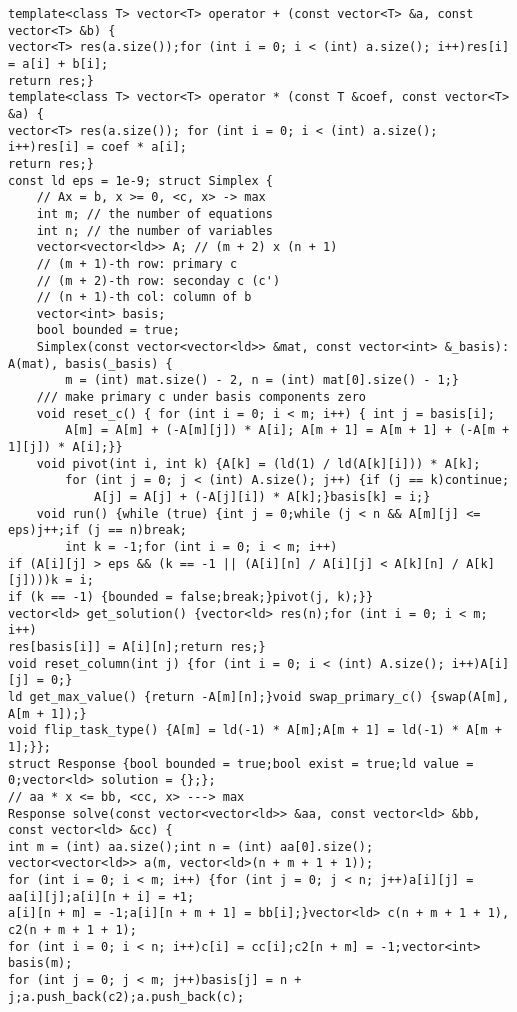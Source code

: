 \documentclass[a4paper,12pt]{article}
\begin{document}
\begin{verbatim}
template<class T> vector<T> operator + (const vector<T> &a, const vector<T> &b) {
vector<T> res(a.size());for (int i = 0; i < (int) a.size(); i++)res[i] = a[i] + b[i];
return res;}
template<class T> vector<T> operator * (const T &coef, const vector<T> &a) {
vector<T> res(a.size()); for (int i = 0; i < (int) a.size(); i++)res[i] = coef * a[i];
return res;}
const ld eps = 1e-9; struct Simplex {
    // Ax = b, x >= 0, <c, x> -> max
    int m; // the number of equations
    int n; // the number of variables
    vector<vector<ld>> A; // (m + 2) x (n + 1)
    // (m + 1)-th row: primary c
    // (m + 2)-th row: seconday c (c')
    // (n + 1)-th col: column of b
    vector<int> basis;
    bool bounded = true;
    Simplex(const vector<vector<ld>> &mat, const vector<int> &_basis): A(mat), basis(_basis) {
        m = (int) mat.size() - 2, n = (int) mat[0].size() - 1;}
    /// make primary c under basis components zero
    void reset_c() { for (int i = 0; i < m; i++) { int j = basis[i];
        A[m] = A[m] + (-A[m][j]) * A[i]; A[m + 1] = A[m + 1] + (-A[m + 1][j]) * A[i];}}
    void pivot(int i, int k) {A[k] = (ld(1) / ld(A[k][i])) * A[k];
        for (int j = 0; j < (int) A.size(); j++) {if (j == k)continue;
            A[j] = A[j] + (-A[j][i]) * A[k];}basis[k] = i;}
    void run() {while (true) {int j = 0;while (j < n && A[m][j] <= eps)j++;if (j == n)break;
        int k = -1;for (int i = 0; i < m; i++)
if (A[i][j] > eps && (k == -1 || (A[i][n] / A[i][j] < A[k][n] / A[k][j])))k = i;
if (k == -1) {bounded = false;break;}pivot(j, k);}}
vector<ld> get_solution() {vector<ld> res(n);for (int i = 0; i < m; i++)
res[basis[i]] = A[i][n];return res;}
void reset_column(int j) {for (int i = 0; i < (int) A.size(); i++)A[i][j] = 0;}
ld get_max_value() {return -A[m][n];}void swap_primary_c() {swap(A[m], A[m + 1]);}
void flip_task_type() {A[m] = ld(-1) * A[m];A[m + 1] = ld(-1) * A[m + 1];}};
struct Response {bool bounded = true;bool exist = true;ld value = 0;vector<ld> solution = {};};
// aa * x <= bb, <cc, x> ---> max
Response solve(const vector<vector<ld>> &aa, const vector<ld> &bb, const vector<ld> &cc) {
int m = (int) aa.size();int n = (int) aa[0].size();
vector<vector<ld>> a(m, vector<ld>(n + m + 1 + 1));
for (int i = 0; i < m; i++) {for (int j = 0; j < n; j++)a[i][j] = aa[i][j];a[i][n + i] = +1;
a[i][n + m] = -1;a[i][n + m + 1] = bb[i];}vector<ld> c(n + m + 1 + 1), c2(n + m + 1 + 1);
for (int i = 0; i < n; i++)c[i] = cc[i];c2[n + m] = -1;vector<int> basis(m);
for (int j = 0; j < m; j++)basis[j] = n + j;a.push_back(c2);a.push_back(c);

\end{verbatim}
\end{document}
